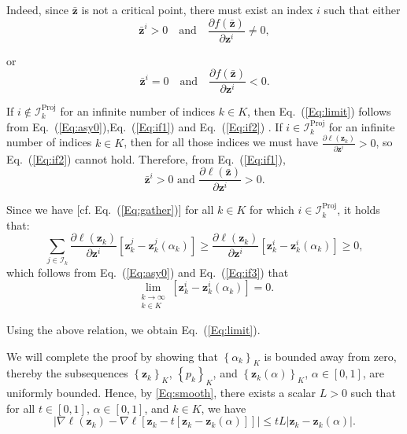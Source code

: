 \documentclass{article}
\theoremstyle{plain}
\theoremstyle{definition}
\def \sI {\mathcal{I}}
\def \z {\mathbf{z}}
\begin{document}
Indeed, since \(\bar{\z}\) is not a critical point, there must exist an index \(i\) such that either
\begin{equation}
\label{Eq:if1}
    \bar{\z}^i > 0 \quad \text{and} \quad \frac{\partial f(\bar{\z})}{\partial \z^i} \neq 0, 
\end{equation}

or
\begin{equation}
\label{Eq:if2}
    \bar{\z}^i = 0 \quad \text{and} \quad \frac{\partial f(\bar{\z})}{\partial \z^i} < 0.
\end{equation}


If \(i \notin \sI_k^{\operatorname{Proj}}\) for an infinite number of indices \(k \in K\), then Eq.~(\ref{Eq:limit}) follows from Eq.~(\ref{Eq:asy0}),Eq.~(\ref{Eq:if1}) and Eq.~(\ref{Eq:if2}) . If \(i \in \sI_k^{\operatorname{Proj}}\) for an infinite number of indices \(k \in K\), then for all those indices we must have \(\frac{\partial \ell\left(\z_k\right)}{\partial \z^i} > 0\), so Eq.~(\ref{Eq:if2}) cannot hold. Therefore, from Eq.~(\ref{Eq:if1}),
\begin{equation}
\label{Eq:if3}
    \bar{\z}^i > 0 \text{ and } \frac{\partial \ell(\bar{\z})}{\partial \z^i} > 0.
\end{equation}


Since we have [cf. Eq.~(\ref{Eq:gather})] for all \(k \in K\) for which \(i \in \sI_k^{\operatorname{Proj}}\), it holds that: 
\[
\sum_{j \in \sI_k} \frac{\partial \ell\left(\z_k\right)}{\partial \z^i}\left[\z_k^j - \z_k^j\left(\alpha_k\right)\right] \geq \frac{\partial \ell\left(\z_k\right)}{\partial \z^i}\left[\z_k^i - \z_k^i\left(\alpha_k\right)\right] \geq 0,
\]
which follows from Eq.~(\ref{Eq:asy0}) and Eq.~(\ref{Eq:if3}) that
\[
\lim _{\substack{k \rightarrow \infty \\ k \in K}}\left[\z_k^i - \z_k^i\left(\alpha_k\right)\right] = 0.
\]

Using the above relation, we obtain Eq.~(\ref{Eq:limit}).

We will complete the proof by showing that \(\left\{\alpha_k\right\}_K\) is bounded away from zero, thereby the subsequences \(\left\{\z_k\right\}_K\), \(\left\{p_k\right\}_K\), and \(\left\{\z_k(\alpha)\right\}_K\), \(\alpha \in[0,1]\), are uniformly bounded. Hence, by \ref{Eq:smooth}, there exists a scalar \(L>0\) such that for all \(t \in[0,1]\), \(\alpha \in[0,1]\), and \(k \in K\), we have
\[
\left|\nabla \ell\left(\z_k\right)-\nabla \ell\left[\z_k - t\left[\z_k - \z_k(\alpha)\right]\right]\right| \leq t L\left|\z_k - \z_k(\alpha)\right|.
\]
\end{document}
